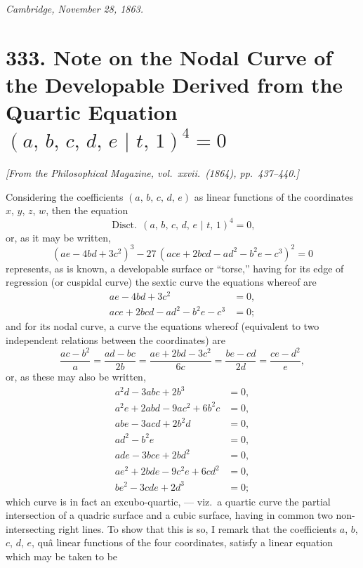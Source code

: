 \documentclass[11pt,a4paper]{article}
\providecommand{\mid}{\,|\,}
\providecommand{\Disct}{\operatorname{Disct.}}
\theoremstyle{plain}
\begin{document}
\medskip
\noindent\textit{Cambridge, November 28, 1863.}

\newpage
\section*{333. Note on the Nodal Curve of the Developable Derived from the Quartic Equation $(a,\,b,\,c,\,d,\,e\,\mid\,t,\,1)^4 = 0$}

\noindent\textit{[From the Philosophical Magazine, vol.\ xxvii.\ (1864), pp.\ 437--440.]}

\medskip

Considering the coefficients $(a,\,b,\,c,\,d,\,e)$ as linear functions of the coordinates $x$, $y$, $z$, $w$, then the equation
\[
\Disct\,(a,\,b,\,c,\,d,\,e\,\mid\,t,\,1)^4 = 0,
\]
or, as it may be written,
\[
(ae - 4bd + 3c^2)^3 - 27\,(ace + 2bcd - ad^2 - b^2 e - c^3)^2 = 0
\]
represents, as is known, a developable surface or ``torse,'' having for its edge of regression (or cuspidal curve) the sextic curve the equations whereof are
\begin{align*}
ae - 4bd + 3c^2 &= 0,\\
ace + 2bcd - ad^2 - b^2 e - c^3 &= 0;
\end{align*}
and for its nodal curve, a curve the equations whereof (equivalent to two independent relations between the coordinates) are
\[
\frac{ac - b^2}{a} = \frac{ad - bc}{2b} = \frac{ae + 2bd - 3c^2}{6c} = \frac{be - cd}{2d} = \frac{ce - d^2}{e},
\]
or, as these may also be written,
\begin{align*}
a^2 d - 3abc + 2b^3 &= 0,\\
a^2 e + 2abd - 9ac^2 + 6b^2 c &= 0,\\
abe - 3acd + 2b^2 d &= 0,\\
ad^2 - b^2 e &= 0,\\
ade - 3bce + 2bd^2 &= 0,\\
ae^2 + 2bde - 9c^2 e + 6cd^2 &= 0,\\
be^2 - 3cde + 2d^3 &= 0;
\end{align*}
which curve is in fact an excubo-quartic, --- viz.\ a quartic curve the partial intersection of a quadric surface and a cubic surface, having in common two non-intersecting right lines. To show that this is so, I remark that the coefficients $a$, $b$, $c$, $d$, $e$, qu\^a linear functions of the four coordinates, satisfy a linear equation which may be taken to be
\end{document}
